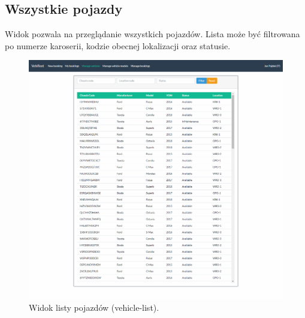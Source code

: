 \documentclass[eng,printmode,openany]{mgr}
\begin{document}
\begin{appendices}
		\section{Wszystkie pojazdy}
		Widok pozwala na przeglądanie wszystkich pojazdów. Lista może być filtrowana po numerze karoserii, kodzie obecnej lokalizacji oraz statusie.
		\begin{figure}[H]
			\centering
			\includegraphics[width=\textwidth]{images/views/vehicle-list.png}
			\caption{Widok listy pojazdów (vehicle-list).}
		\end{figure}
		
		\newpage

\end{appendices}
\end{document}
